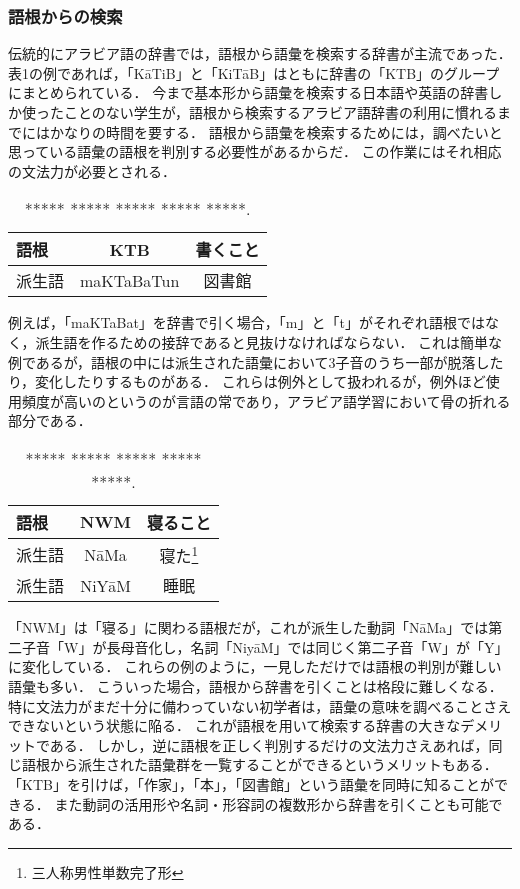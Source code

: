 \documentclass[technicalreport]{ieicej}
\begin{document}
\subsubsection{語根からの検索}
伝統的にアラビア語の辞書では，語根から語彙を検索する辞書が主流であった．
表1の例であれば，「KāTiB」と「KiTāB」はともに辞書の「KTB」のグループにまとめられている．
今まで基本形から語彙を検索する日本語や英語の辞書しか使ったことのない学生が，語根から検索するアラビア語辞書の利用に慣れるまでにはかなりの時間を要する．
語根から語彙を検索するためには，調べたいと思っている語彙の語根を判別する必要性があるからだ．
この作業にはそれ相応の文法力が必要とされる．

\begin{table}[ht]
\begin{center}
\begin{tabular}{l|cc}
   語根& KTB & 書くこと\\
  \hline
 派生語& maKTaBaTun & 図書館\\
\hline
\end{tabular}
\caption{***** ***** ***** ***** *****.}
\label{table:alignment}
\end{center}
\end{table}
例えば，「maKTaBat」を辞書で引く場合，「m」と「t」がそれぞれ語根ではなく，派生語を作るための接辞であると見抜けなければならない．
これは簡単な例であるが，語根の中には派生された語彙において3子音のうち一部が脱落したり，変化したりするものがある．
これらは例外として扱われるが，例外ほど使用頻度が高いのというのが言語の常であり，アラビア語学習において骨の折れる部分である．

\begin{table}[ht]
\begin{center}
\begin{tabular}{l|cc}
   語根& NWM & 寝ること\\
  \hline
 派生語& NāMa & 寝た\footnote{三人称男性単数完了形}\\
  派生語& NiYāM & 睡眠\\
\hline
\end{tabular}
\caption{***** ***** ***** ***** *****.}
\label{table:alignment}
\end{center}
\end{table}

「NWM」は「寝る」に関わる語根だが，これが派生した動詞「NāMa」では第二子音「W」が長母音化し，名詞「NiyāM」では同じく第二子音「W」が「Y」に変化している．
これらの例のように，一見しただけでは語根の判別が難しい語彙も多い．
こういった場合，語根から辞書を引くことは格段に難しくなる．
特に文法力がまだ十分に備わっていない初学者は，語彙の意味を調べることさえできないという状態に陥る．
これが語根を用いて検索する辞書の大きなデメリットである．
しかし，逆に語根を正しく判別するだけの文法力さえあれば，同じ語根から派生された語彙群を一覧することができるというメリットもある．
「KTB」を引けば，「作家」，「本」，「図書館」という語彙を同時に知ることができる．
また動詞の活用形や名詞・形容詞の複数形から辞書を引くことも可能である．
\end{document}
